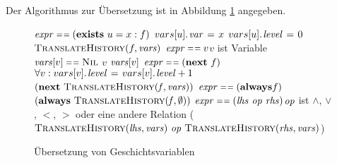 Der Algorithmus zur Übersetzung ist in Abbildung \ref{fig:translate_history} angegeben.
\begin{figure}[h]
\begin{codebox}
\li \If $\id{expr}\isequal (\textbf{exists}\ u=x : f)$ \Then
\li $\attrib{vars[u]}{var}\gets x$
\li $\attrib{vars[u]}{level}\gets 0$
\li \Return $\proc{TranslateHistory}(f,\id{vars})$
\li \ElseIf $\id{expr}\isequal v$\>\>\>\>\>\>\Comment$v$ ist Variable
\Then
\li \If $\id{vars}[v]\isequal\const{Nil}$\Then
\li \Return $v$
\li \Else \Return $\id{vars}[v]$
\End
\li \ElseIf $\id{expr}\isequal (\textbf{next}\ f)$\Then
\li $\forall v: \attrib{vars[v]}{level}\gets \attrib{vars[v]}{level}+1$
\li \Return $(\textbf{next}\ \proc{TranslateHistory}(\id{f},\id{vars}))$
\li \ElseIf $\id{expr}\isequal (\textbf{always} f)$\Then
\li \Return $(\textbf{always}\ \proc{TranslateHistory}(\id{f},\emptyset))$
\li \ElseIf $\id{expr}\isequal (\id{lhs}\ \id{op}\ \id{rhs})$\>\>\>\>\>\>\Comment $\id{op}$ ist $\land$, $\lor$, $<$, $>$ oder eine andere Relation
\Then
\li \Return ($\proc{TranslateHistory}(\id{lhs},\id{vars})\ \id{op}\ \proc{TranslateHistory}(\id{rhs},\id{vars})$)
\End
\end{codebox}
\caption{Übersetzung von Geschichtsvariablen}
\label{fig:translate_history}
\end{figure}